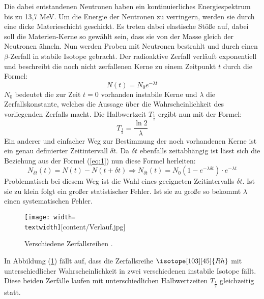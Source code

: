 Die dabei entstandenen Neutronen haben ein kontinuierliches Energiespektrum bis zu 13,7 MeV. Um die Energie der Neutronen zu verringern, werden sie durch eine
dicke Materieschicht geschickt. Es treten dabei elastische Stöße auf, dabei soll die
Materien-Kerne so gewählt sein, dass sie von der Masse gleich der Neutronen ähneln.
Nun werden Proben mit Neutronen bestrahlt und durch einen $\beta$-Zerfall in stabile Isotope gebracht.
Der radioaktive Zerfall verläuft exponentiell und beschreibt die noch nicht zerfallenen Kerne zu einem Zeitpunkt $t$ durch die Formel:
\begin{equation}
  N(t)= N_0 e^{-\lambda t}
  \label{eq:1}
\end{equation}
$N_0$ bedeutet die zur Zeit $t = 0$ vorhanden instabile Kerne und $\lambda$ die Zerfallskonstante, welches die Aussage über die Wahrscheinlichkeit
des vorliegenden Zerfalls macht.
Die Halbwertzeit $T_{\frac{1}{2}}$ ergibt nun mit der Formel:
\begin{equation}
  T_{\frac{1}{2}} = \frac{\ln 2}{\lambda}
  \label{eq:2}
\end{equation}
Ein anderer und einfacher Weg zur Bestimmung der noch vorhandenen Kerne ist
ein genau definierter Zeitintervall $\delta t$.
Da $\delta t$ ebenfalls zeitabhängig ist lässt sich die Beziehung aus der Formel (\ref{eq:1})
nun diese Formel herleiten:
\begin{equation}
  N_{\delta t} (t) = N(t) - N(t+\delta t) \Rightarrow N_{\delta t} (t) =N_0 (1-e^{-\lambda \delta t}) \cdot e^{-\lambda t}
  \label{eq:3}
\end{equation}
Problematisch bei diesem Weg ist die Wahl eines geeigneten Zeitintervalls $\delta t$. Ist sie zu klein folgt ein großer statistischer Fehler.
Ist sie zu große so bekommt $\lambda$ einen systematischen Fehler.
\begin{figure}
  \texttt{[image: width=\\textwidth]}[content/Verlauf.jpg]
  \caption{Verschiedene Zerfallsreihen \cite{1}.}
  \label{abb:1}
\end{figure}
In Abbildung (\ref{abb:1}) fällt auf, dass die Zerfallsreihe $\isotope[103][45]{Rh}$ mit unterschiedlicher Wahrscheinlichkeit
in zwei verschiedenen instabile Isotope fällt.
Diese beiden Zerfälle laufen mit unterschiedlichen Halbwertzeiten $T_{\frac{1}{2}}$ gleichzeitig statt.
